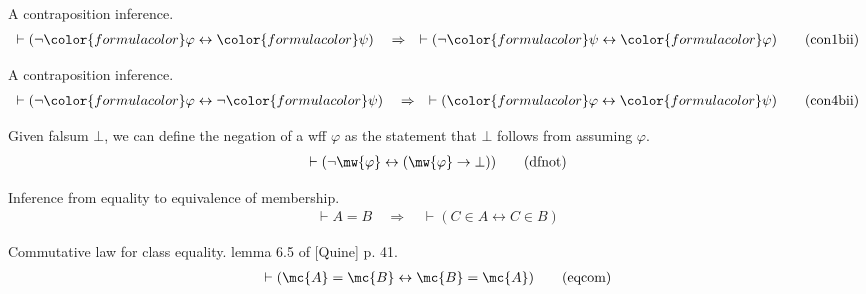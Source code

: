 \begin{lemma} {A contraposition inference.}  
\begin{align}
\vdash ( \lnot {\color{formulacolor}\varphi} \leftrightarrow
    {\color{formulacolor}\psi} )\quad\Rightarrow\quad \vdash ( \lnot
    {\color{formulacolor}\psi} \leftrightarrow {\color{formulacolor}\varphi}
    )\label{eq:con1bii}\tag{con1bii}
\end{align}
\end{lemma}


\begin{lemma} {A contraposition inference.}  
\begin{align}
\vdash ( \lnot {\color{formulacolor}\varphi} \leftrightarrow \lnot
    {\color{formulacolor}\psi} )\quad\Rightarrow\quad \vdash (
    {\color{formulacolor}\varphi} \leftrightarrow {\color{formulacolor}\psi}
    )\label{eq:con4bii}\tag{con4bii}
\end{align}
\end{lemma}


\begin{lemma} {Given falsum $\bot$, we can define the
negation of a wff} $\varphi$ as the
     statement that $\bot$ follows from assuming $\varphi$.  %
\begin{align}
\vdash ( \lnot \mw{\varphi} \leftrightarrow ( \mw{\varphi} \rightarrow \bot )
    )\label{eq:dfnot}\tag{dfnot}
\end{align}
\end{lemma}


\begin{lemma}  {Inference from equality to equivalence of
membership.}
\begin{align}
\vdash A = B\quad\Rightarrow\quad \vdash ( C \in A \leftrightarrow C \in B
    )\label{eq:eleq2i}\tag{eleq2i}
\end{align}
\end{lemma}


\begin{lemma} {Commutative law for class equality.}  lemma
6.5 of [Quine] p. 41.
\begin{align}
\vdash ( \mc{A} = \mc{B} \leftrightarrow \mc{B} = \mc{A} )\label{eq:eqcom}\tag{eqcom}
\end{align}
\end{lemma}


